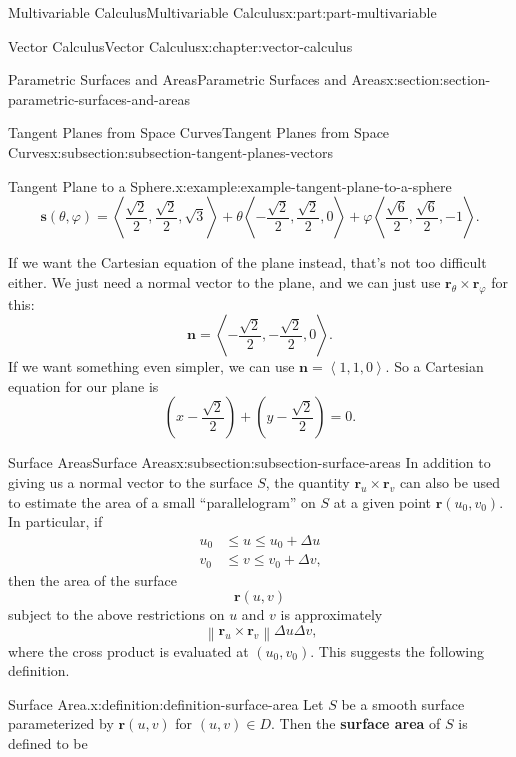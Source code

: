 \documentclass[twoside,10pt,]{tufte-book}
\newcommand{\terminology}[1]{\textbf{#1}}
\numberwithin{equation}{part}
\newcommand{\vb}[1]{\mathbf{#1}}
\newcommand{\norm}[1]{\left\| #1 \right\|}
\newcommand{\dotprod}[1]{\left\langle #1 \right\rangle}
\newcommand{\parens}[1]{\left( #1 \right)}
\newcommand{\amp}{&}
\begin{document}
\begin{partptx}{Multivariable Calculus}{}{Multivariable Calculus}{}{}{x:part:part-multivariable}
\begin{chapterptx}{Vector Calculus}{}{Vector Calculus}{}{}{x:chapter:vector-calculus}
\begin{sectionptx}{Parametric Surfaces and Areas}{}{Parametric Surfaces and Areas}{}{}{x:section:section-parametric-surfaces-and-areas}
\begin{subsectionptx}{Tangent Planes from Space Curves}{}{Tangent Planes from Space Curves}{}{}{x:subsection:subsection-tangent-planes-vectors}
\begin{example}{Tangent Plane to a Sphere.}{x:example:example-tangent-plane-to-a-sphere}
\begin{equation*}
\vb{s}(\theta,\varphi) = \dotprod{\frac{\sqrt{2}}{2}, \frac{\sqrt{2}}{2}, \sqrt{3}} + \theta\dotprod{-\frac{\sqrt{2}}{2}, \frac{\sqrt{2}}{2}, 0} + \varphi\dotprod{\frac{\sqrt{6}}{2}, \frac{\sqrt{6}}{2}, -1}\text{.}
\end{equation*}
%
\par
If we want the Cartesian equation of the plane instead, that's not too difficult either. We just need a normal vector to the plane, and we can just use \(\vb{r}_{\theta}\times\vb{r}_{\varphi}\) for this:%
\begin{equation*}
\vb{n} = \dotprod{-\frac{\sqrt{2}}{2}, -\frac{\sqrt{2}}{2},0}\text{.}
\end{equation*}
If we want something even simpler, we can use \(\vb{n} = \dotprod{1,1,0}\). So a Cartesian equation for our plane is%
\begin{equation*}
\parens{x -\frac{\sqrt{2}}{2}} + \parens{y-\frac{\sqrt{2}}{2}} = 0\text{.}
\end{equation*}
%
\end{example}
\end{subsectionptx}
%
%
\typeout{************************************************}
\typeout{************************************************}
%
\begin{subsectionptx}{Surface Areas}{}{Surface Areas}{}{}{x:subsection:subsection-surface-areas}
In addition to giving us a normal vector to the surface \(S\), the quantity \(\vb{r}_{u}\times\vb{r}_{v}\) can also be used to estimate the area of a small ``parallelogram'' on \(S\) at a given point \(\vb{r}(u_{0}, v_{0})\). In particular, if%
\begin{align*}
u_{0} \amp \leq u\leq u_{0} + \Delta u \\
v_{0} \amp \leq v\leq v_{0} + \Delta v \text{,}
\end{align*}
then the area of the surface%
\begin{equation*}
\vb{r}(u,v)
\end{equation*}
subject to the above restrictions on \(u\) and \(v\) is approximately%
\begin{equation*}
\norm{\vb{r}_{u}\times\vb{r}_{v}}\Delta u\Delta v\text{,}
\end{equation*}
where the cross product is evaluated at \((u_{0}, v_{0})\). This suggests the following definition.%
\begin{definition}{Surface Area.}{x:definition:definition-surface-area}%
%
Let \(S\) be a smooth surface parameterized by \(\vb{r}(u,v)\) for \((u,v)\in D\). Then the \terminology{surface area} of \(S\) is defined to be%

\end{definition}
\end{subsectionptx}
\end{sectionptx}
\end{chapterptx}
\end{partptx}
\end{document}
